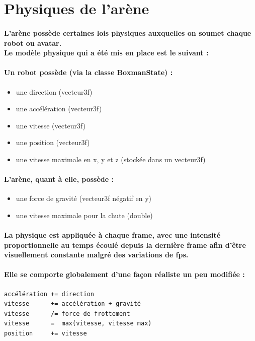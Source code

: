 \newpage
\section{Physiques de l'arène}
\paragraph{L'arène possède certaines lois physiques auxquelles on soumet chaque robot ou avatar.\\
Le modèle physique qui a été mis en place est le suivant :}

\paragraph{Un robot possède (via la classe \textbf{BoxmanState}) :}
\begin{itemize}
	\item une direction (vecteur3f)
	\item une accélération (vecteur3f)
	\item une vitesse (vecteur3f)
	\item une position (vecteur3f)
	\item une vitesse maximale en x, y et z (stockée dans un vecteur3f)
\end{itemize}

\vspace{0.5cm}

\paragraph{L'arène, quant à elle, possède :}
\begin{itemize}
	\item une force de gravité (vecteur3f négatif en y)
	\item une vitesse maximale pour la chute (double)
\end{itemize}

\paragraph{La physique est appliquée à chaque frame, avec une intensité proportionnelle au temps écoulé depuis la dernière frame afin d'être visuellement constante malgré des variations de fps.}

\paragraph{Elle se comporte globalement d'une façon réaliste un peu modifiée :}
\begin{verbatim}
accélération += direction
vitesse      += accélération + gravité
vitesse      /= force de frottement
vitesse      =  max(vitesse, vitesse max)
position     += vitesse
\end{verbatim}
